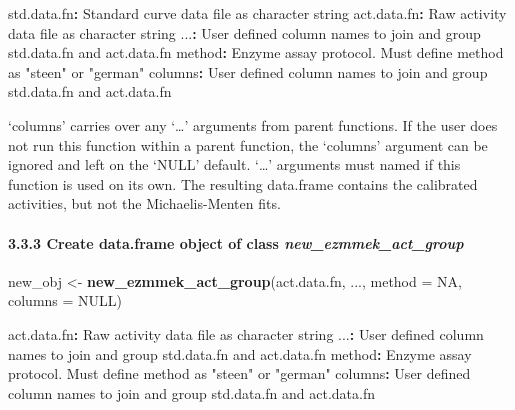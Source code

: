 \documentclass[
]{article}
\newenvironment{Shaded}{\begin{snugshade}}{\end{snugshade}}
\newcommand{\DataTypeTok}[1]{\textcolor[rgb]{0.13,0.29,0.53}{#1}}
\newcommand{\KeywordTok}[1]{\textcolor[rgb]{0.13,0.29,0.53}{\textbf{#1}}}
\newcommand{\NormalTok}[1]{#1}
\newcommand{\OperatorTok}[1]{\textcolor[rgb]{0.81,0.36,0.00}{\textbf{#1}}}
\newcommand{\OtherTok}[1]{\textcolor[rgb]{0.56,0.35,0.01}{#1}}
\newcommand{\StringTok}[1]{\textcolor[rgb]{0.31,0.60,0.02}{#1}}
\begin{document}
\begin{Shaded}
\begin{Highlighting}[]
\NormalTok{std.data.fn}\OperatorTok{:}\StringTok{ }\NormalTok{Standard curve data file as character string}
\NormalTok{act.data.fn}\OperatorTok{:}\StringTok{ }\NormalTok{Raw activity data file as character string}
\NormalTok{...}\OperatorTok{:}\StringTok{ }\NormalTok{User defined column names to join and group std.data.fn and act.data.fn}
\NormalTok{method}\OperatorTok{:}\StringTok{ }\NormalTok{Enzyme assay protocol. Must define method as }\StringTok{\textquotesingle{}"steen"\textquotesingle{}}\NormalTok{ or }\StringTok{\textquotesingle{}"german"\textquotesingle{}}
\NormalTok{columns}\OperatorTok{:}\StringTok{ }\NormalTok{User defined column names to join and group std.data.fn and act.data.fn}
\end{Highlighting}
\end{Shaded}

`columns' carries over any `\ldots{}' arguments from parent functions.
If the user does not run this function within a parent function, the
`columns' argument can be ignored and left on the `NULL' default.
`\ldots{}' arguments must named if this function is used on its own. The
resulting data.frame contains the calibrated activities, but not the
Michaelis-Menten fits.

\hypertarget{create-data.frame-object-of-class-new_ezmmek_act_group}{%
\paragraph{\texorpdfstring{3.3.3 Create data.frame object of class
\emph{new\_ezmmek\_act\_group}}{3.3.3 Create data.frame object of class new\_ezmmek\_act\_group}}\label{create-data.frame-object-of-class-new_ezmmek_act_group}}

\begin{Shaded}
\begin{Highlighting}[]
\NormalTok{new\_obj <{-}}\StringTok{ }\KeywordTok{new\_ezmmek\_act\_group}\NormalTok{(act.data.fn,}
\NormalTok{                                ...,}
                                \DataTypeTok{method =} \OtherTok{NA}\NormalTok{,}
                                \DataTypeTok{columns =} \OtherTok{NULL}\NormalTok{)}
\end{Highlighting}
\end{Shaded}

\begin{Shaded}
\begin{Highlighting}[]
\NormalTok{act.data.fn}\OperatorTok{:}\StringTok{ }\NormalTok{Raw activity data file as character string}
\NormalTok{...}\OperatorTok{:}\StringTok{ }\NormalTok{User defined column names to join and group std.data.fn and act.data.fn}
\NormalTok{method}\OperatorTok{:}\StringTok{ }\NormalTok{Enzyme assay protocol. Must define method as }\StringTok{\textquotesingle{}"steen"\textquotesingle{}}\NormalTok{ or }\StringTok{\textquotesingle{}"german"\textquotesingle{}}
\NormalTok{columns}\OperatorTok{:}\StringTok{ }\NormalTok{User defined column names to join and group std.data.fn and act.data.fn}
\end{Highlighting}
\end{Shaded}
\end{document}
